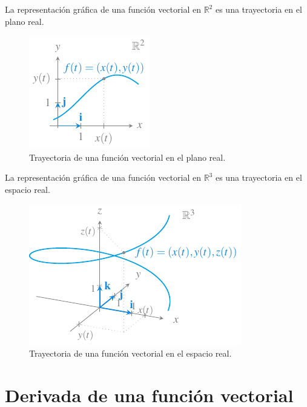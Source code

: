 \documentclass[
  a4paper,
]{scrreport}
\theoremstyle{definition}
\theoremstyle{plain}
\theoremstyle{plain}
\theoremstyle{plain}
\theoremstyle{definition}
\theoremstyle{remark}
\begin{document}
La representación gráfica de una función vectorial en \(\mathbb{R}^2\)
es una trayectoria en el plano real.

\begin{figure}

{\centering \includegraphics{img/derivadas-funciones-vectoriales/trayectoria-plano.pdf}

}

\caption{Trayectoria de una función vectorial en el plano real.}

\end{figure}

La representación gráfica de una función vectorial en \(\mathbb{R}^3\)
es una trayectoria en el espacio real.

\begin{figure}

{\centering \includegraphics{img/derivadas-funciones-vectoriales/trayectoria-espacio.pdf}

}

\caption{Trayectoria de una función vectorial en el espacio real.}

\end{figure}

\hypertarget{derivada-de-una-funciuxf3n-vectorial}{%
\section{Derivada de una función
vectorial}\label{derivada-de-una-funciuxf3n-vectorial}}
\end{document}
